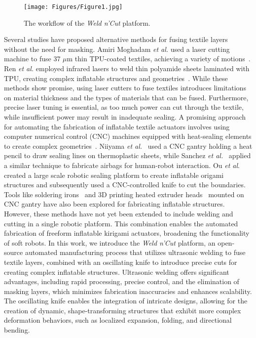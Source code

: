 \documentclass[journal, letterpaper]{IEEEtran}
\begin{document}
\begin{figure}[t]
\centering
\texttt{[image: Figures/Figure1.jpg]}
\caption{The workflow of the \textit{Weld n'Cut} platform.}
\label{Fig1}
\end{figure}

Several studies have proposed alternative methods for fusing textile layers without the need for masking. Amiri Moghadam \textit{et al.} used a laser cutting machine to fuse 37 $\mu$m thin TPU-coated textiles, achieving a variety of motions~\cite{lasercut_1}. Ren \textit{et al.} employed infrared lasers to weld thin polyamide sheets laminated with TPU, creating complex inflatable structures and geometries~\cite{laser_cut2}. While these methods show promise, using laser cutters to fuse textiles introduces limitations on material thickness and the types of materials that can be fused. Furthermore, precise laser tuning is essential, as too much power can cut through the textile, while insufficient power may result in inadequate sealing.
A promising approach for automating the fabrication of inflatable textile actuators involves using computer numerical control (CNC) machines equipped with heat-sealing elements to create complex geometries~\cite{heat_sealing}. Niiyama \textit{et al.}~\cite{sticky_actuator} used a CNC gantry holding a heat
pencil to draw sealing lines on thermoplastic sheets, while Sanchez \textit{et al.}~\cite{airbag} applied a similar technique to fabricate airbags for human-robot interaction. Ou \textit{et al}. \cite{aeromorph} created a large scale robotic sealing platform to create inflatable origami structures and subsequently used a CNC-controlled knife to cut the boundaries. Tools like soldering irons~\cite{soldering} and 3D printing heated extruder heads~\cite{extruder} mounted on CNC gantry have also been explored for fabricating inflatable structures. However, these methods have not yet been extended to include welding and cutting in a single robotic platform. This combination enables the automated fabrication of freeform inflatable kirigami actuators, broadening the functionality of soft robots.
In this work, we introduce the \textit{Weld n'Cut} platform, an open-source automated manufacturing process that utilizes ultrasonic welding to fuse textile layers, combined with an oscillating knife to introduce precise cuts for creating complex inflatable structures. Ultrasonic welding offers significant advantages, including rapid processing, precise control, and the elimination of masking layers, which minimizes fabrication inaccuracies and enhances scalability. The oscillating knife enables the integration of intricate designs, allowing for the creation of dynamic, shape-transforming structures that exhibit more complex deformation behaviors, such as localized expansion, folding, and directional bending.
\end{document}
